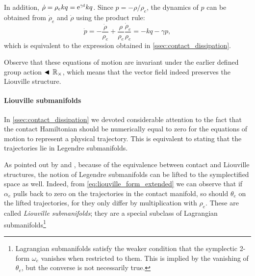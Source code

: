In addition, \(\dot{\rho} = \rho_e kq = \mathrm{e}^{\gamma t} kq\). Since \(p = -\rho/\rho_e\), the dynamics of \(p\) can be obtained from  \(\dot{\rho}_e\) and \(\dot{\rho}\) using the product rule:
\begin{equation} 
    \dot{p} = -\frac{\dot{\rho}}{\rho_e} + \frac{\rho}{\rho_e}\frac{\dot{\rho}_e}{\rho_e} = -kq - \gamma p,
    \label{eq:pdot}
\end{equation}
which is equivalent to the expression obtained in \cref{ssec:contact_dissipation}.

Observe that these equations of motion are invariant under the earlier defined group action \(\blacktriangleleft\,\mathbb{R}_{\times}\), which means that the vector field indeed preserves the Liouville structure. 

\paragraph{Liouville submanifolds} In \cref{ssec:contact_dissipation} we devoted considerable attention to the fact that the contact Hamiltonian should be numerically  equal to zero for the equations of motion to represent a physical trajectory. This is equivalent to stating that the trajectories lie in Legendre submanifolds.

As pointed out by \citet{VanderSchaft2021a} and \citet{Libermann1987}, because of the equivalence between contact and Liouville structures, the notion of Legendre submanifolds can be lifted to the symplectified space as well. Indeed, from \cref{eq:liouville_form_extended} we can observe that if \(\alpha_e\) pulls back to zero on the trajectories in the contact manifold, so should \(\theta_e\) on the lifted trajectories, for they only differ by multiplication with \(\rho_e\). These are called \emph{Liouville submanifolds}; they are a special subclass of Lagrangian submanifolds\footnote{Lagrangian submanifolds satisfy the weaker condition that the symplectic 2-form \(\omega_e\) vanishes when restricted to them. This is implied by the vanishing of \(\theta_e\), but the converse is not necessarily true.}

